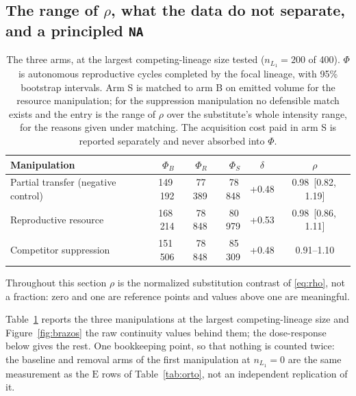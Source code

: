 \documentclass[review,3p,times]{elsarticle}
\begin{document}
\subsection{The range of \texorpdfstring{$\rho$}{rho}, what the data do not separate, and a principled \texttt{NA}}

\begin{table}[ht]
\centering\small
\caption{The three arms, at the largest competing-lineage size tested ($n_{L_1}=200$ of 400). $\Phi$ is autonomous reproductive cycles completed by the focal
lineage, with 95\% bootstrap intervals. Arm S is matched to arm B on
emitted volume for the resource manipulation; for the suppression
manipulation no defensible match exists and the entry is the range of
$\rho$ over the substitute's whole intensity range, for the reasons
given under matching. The acquisition cost paid in arm S is reported
separately and never absorbed into $\Phi$.}
\label{tab:brazos}
\begin{tabular}{lrrrcc}
\toprule
\textbf{Manipulation} & $\Phi_B$ & $\Phi_R$ & $\Phi_S$ & $\delta$ & $\rho$\\
\midrule
Partial transfer (negative control) & 149\,192 & 77\,389 & 78\,848 & +0.48 & 0.98~[0.82,\,1.19]\\
Reproductive resource & 168\,214 & 78\,848 & 80\,979 & +0.53 & 0.98~[0.86,\,1.11]\\
Competitor suppression & 151\,506 & 78\,848 & 85\,309 & +0.48 & 0.91--1.10\\
\bottomrule
\end{tabular}
\end{table}

Throughout this section $\rho$ is the normalized substitution contrast
of \eqref{eq:rho}, not a fraction: zero and one are reference points
and values above one are meaningful.

Table~\ref{tab:brazos} reports the three manipulations at the largest
competing-lineage size and Figure~\ref{fig:brazos} the raw continuity
values behind them; the dose-response below gives the rest. One
bookkeeping point, so that nothing is counted twice: the baseline and
removal arms of the first manipulation at $n_{L_1}=0$ are the same
measurement as the $\mathrm{E}$ rows of Table~\ref{tab:orto}, not an
independent replication of it.
\end{document}
